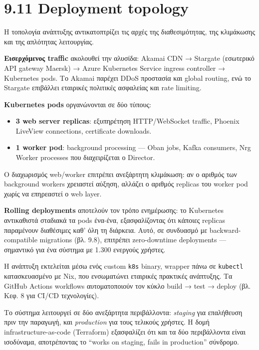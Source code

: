 \section{9.11 Deployment topology}\label{deployment-topology}

Η τοπολογία ανάπτυξης αντικατοπτρίζει τις αρχές της διαθεσιμότητας, της
κλιμάκωσης και της απλότητας λειτουργίας.

\textbf{Εισερχόμενος traffic} ακολουθεί την αλυσίδα: Akamai CDN →
Stargate (εσωτερικό API gateway Maersk) → Azure Kubernetes Service
ingress controller → Kubernetes pods. Το Akamai παρέχει DDoS προστασία
και global routing, ενώ το Stargate επιβάλλει εταιρικές πολιτικές
ασφαλείας και rate limiting.

\textbf{Kubernetes pods} οργανώνονται σε δύο τύπους:

\begin{itemize}
\tightlist
\item
  \textbf{3 web server replicas}: εξυπηρέτηση HTTP/WebSocket traffic,
  Phoenix LiveView connections, certificate downloads.
\item
  \textbf{1 worker pod}: background processing --- Oban jobs, Kafka
  consumers, Nrg Worker processes που διαχειρίζεται ο Director.
\end{itemize}

Ο διαχωρισμός web/worker επιτρέπει ανεξάρτητη κλιμάκωση: αν ο αριθμός
των background workers χρειαστεί αύξηση, αλλάζει ο αριθμός replicas του
worker pod χωρίς να επηρεαστεί ο web layer.

\textbf{Rolling deployments} αποτελούν τον τρόπο ενημέρωσης: το
Kubernetes αντικαθιστά σταδιακά τα pods ένα-ένα, εξασφαλίζοντας ότι
κάποιες replicas παραμένουν διαθέσιμες καθ' όλη τη διάρκεια. Αυτό, σε
συνδυασμό με backward-compatible migrations (βλ. 9.8), επιτρέπει
zero-downtime deployments --- σημαντικό για ένα σύστημα με 1.300
ενεργούς χρήστες.

Η ανάπτυξη εκτελείται μέσω ενός custom \texttt{k8s} binary, wrapper πάνω
σε \texttt{kubectl} κατασκευασμένο με Nix, που ενσωματώνει εταιρικές
πρακτικές ανάπτυξης. Τα GitHub Actions workflows αυτοματοποιούν τον
κύκλο build → test → deploy (βλ. Κεφ. 8 για CI/CD τεχνολογίες).

Το σύστημα λειτουργεί σε δύο ανεξάρτητα περιβάλλοντα: \emph{staging} για
επαλήθευση πριν την παραγωγή, και \emph{production} για τους τελικούς
χρήστες. Η δομή infrastructure-as-code (Terraform) εξασφαλίζει ότι και
τα δύο περιβάλλοντα είναι ισοδύναμα, αποτρέποντας το ``works on staging,
fails in production'' σύνδρομο.

